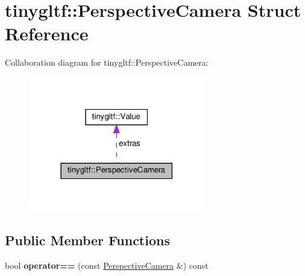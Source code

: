 \hypertarget{structtinygltf_1_1PerspectiveCamera}{}\section{tinygltf\+:\+:Perspective\+Camera Struct Reference}
\label{structtinygltf_1_1PerspectiveCamera}


Collaboration diagram for tinygltf\+:\+:Perspective\+Camera\+:\nopagebreak
\begin{figure}[H]
\begin{center}
\leavevmode
\includegraphics[width=218pt]{structtinygltf_1_1PerspectiveCamera__coll__graph}
\end{center}
\end{figure}
\subsection*{Public Member Functions}
\begin{DoxyCompactItemize}
\item 
\mbox{\label{structtinygltf_1_1PerspectiveCamera_abb1bc79c7d1d1a5590d1c7faf75bb2c0}} 
bool {\bfseries operator==} (const \hyperlink{structtinygltf_1_1PerspectiveCamera}{Perspective\+Camera} \&) const
\end{DoxyCompactItemize}
